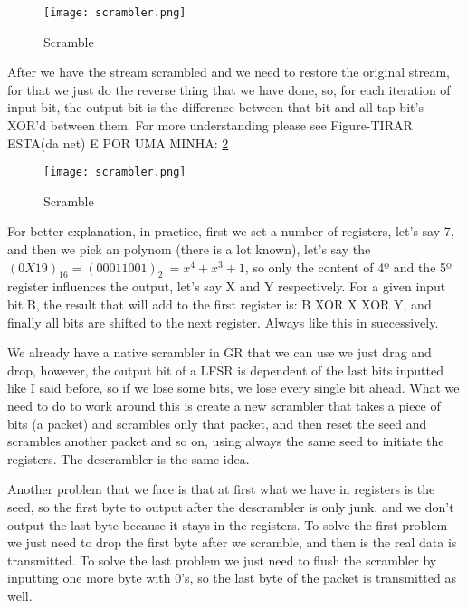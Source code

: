 \documentclass[a4paper, 10pt, conference]{ieeeconf}      %
\begin{document}
    \begin{figure}
        \centering
        \texttt{[image: scrambler.png]}
        \caption{Scramble}
        \label{fig:scramble}
    \end{figure}
    
    
    After we have the stream scrambled and we need to restore the original stream, for that we just do the reverse thing that we have done, so, for each iteration of input bit, the output bit is the difference between that bit and all tap bit's XOR'd between them. For more understanding please see Figure-TIRAR ESTA(da net) E POR UMA MINHA: \ref{fig:descramble}
    
    \begin{figure}
        \centering
        \texttt{[image: scrambler.png]}
        \caption{Scramble}
        \label{fig:descramble}
    \end{figure}
    

    For better explanation, in practice, first we set a number of registers, let's say 7, and then we pick an polynom (there is a lot known), let's say the \((0X19)_{16} = (00011001)_2\ = x^4 + x^3 + 1\), so only the content of 4º and the 5º register influences the output, let's say X and Y respectively. For a given input bit B, the result that will add to the first register is: B XOR X XOR Y, and finally all bits are shifted to the next register. Always like this in successively. 
    
    
    We already have a native scrambler in GR that we can use we just drag and drop, however, the output bit of a LFSR is dependent of the last bits inputted like I said before, so if we lose some bits, we lose every single bit ahead. What we need to do to work around this is create a new scrambler that takes a piece of bits (a packet) and scrambles only that packet, and then reset the seed and scrambles another packet and so on, using always the same seed to initiate the registers. The descrambler is the same idea.
    
    Another problem that we face is that at first what we have in registers is the seed, so the first byte to output after the descrambler is only junk, and we don't output the last byte because it stays in the registers. To solve the first problem we just need to drop the first byte after we scramble, and then is the real data is transmitted. To solve the last problem we just need to flush the scrambler by inputting one more byte with 0's, so the last byte of the packet is transmitted as well.  
    
\end{document}
